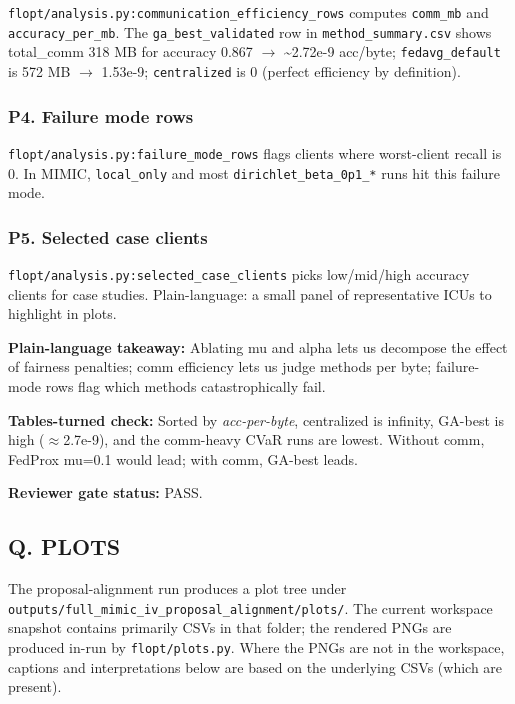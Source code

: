 \documentclass{article}
\begin{document}
\texttt{flopt/analysis.py:communication\_efficiency\_rows} computes \texttt{comm\_mb} and \texttt{accuracy\_per\_mb}. The \texttt{ga\_best\_validated} row in \texttt{method\_summary.csv} shows total\_comm 318 MB for accuracy 0.867 \ensuremath{\rightarrow} \textasciitilde{}2.72e-9 acc/byte; \texttt{fedavg\_default} is 572 MB \ensuremath{\rightarrow} 1.53e-9; \texttt{centralized} is 0 (perfect efficiency by definition).


\subsubsection{P4. Failure mode rows}


\texttt{flopt/analysis.py:failure\_mode\_rows} flags clients where worst-client recall is 0. In MIMIC, \texttt{local\_only} and most \texttt{dirichlet\_beta\_0p1\_*} runs hit this failure mode.


\subsubsection{P5. Selected case clients}


\texttt{flopt/analysis.py:selected\_case\_clients} picks low/mid/high accuracy clients for case studies. Plain-language: a small panel of representative ICUs to highlight in plots.


\textbf{Plain-language takeaway:} Ablating mu and alpha lets us decompose the effect of fairness penalties; comm efficiency lets us judge methods per byte; failure-mode rows flag which methods catastrophically fail.


\textbf{Tables-turned check:} Sorted by \emph{acc-per-byte}, centralized is infinity, GA-best is high (\ensuremath{\approx}2.7e-9), and the comm-heavy CVaR runs are lowest. Without comm, FedProx mu=0.1 would lead; with comm, GA-best leads.


\textbf{Reviewer gate status:} PASS.


\subsection{Q. PLOTS}


The proposal-alignment run produces a plot tree under \texttt{outputs/full\_mimic\_iv\_proposal\_alignment/plots/}. The current workspace snapshot contains primarily CSVs in that folder; the rendered PNGs are produced in-run by \texttt{flopt/plots.py}. Where the PNGs are not in the workspace, captions and interpretations below are based on the underlying CSVs (which are present).
\end{document}
